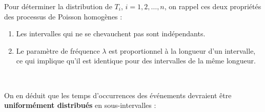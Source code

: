 \documentclass[french]{article}
\begin{document}
\begin{multicols*}{2}
Pour déterminer la distribution de $T_{i}$, $i	=	1, 2, \dots, n$, on rappel ces deux propriétés des processus de Poisson homogènes :
\begin{enumerate}[label	=	\circled{\arabic*}{trueblue}]
	\item	Les intervalles qui ne se chevauchent pas sont indépendants.
	\item	Le paramètre de fréquence $\lambda$ est proportionnel à la longueur d'un intervalle, ce qui implique qu'il est identique pour des intervalles de la même longueur.
\end{enumerate}

\

On en déduit que les temps d'occurrences des événements devraient être \textbf{\textcolor{armygreen}{uniformément} distribués} en  sous-intervalles : 
\begin{center}
\begin{tikzpicture}[x=0.75pt,y=0.75pt,yscale=-1,xscale=1]


\end{tikzpicture}
\end{center}
\end{multicols*}
\end{document}
